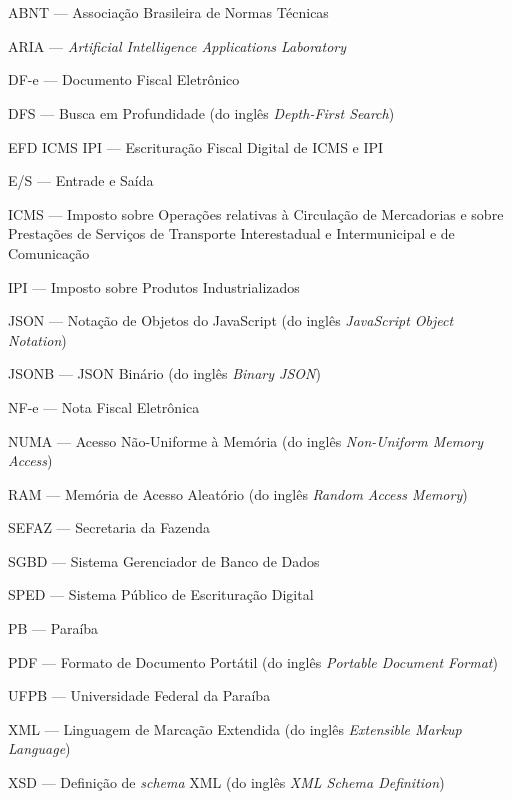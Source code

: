 \section*{}

ABNT --- Associação Brasileira de Normas Técnicas

ARIA --- \textit{Artificial Intelligence Applications Laboratory}

DF-e --- Documento Fiscal Eletrônico

DFS --- Busca em Profundidade (do inglês \textit{Depth-First Search})

EFD ICMS IPI --- Escrituração Fiscal Digital de ICMS e IPI

E/S --- Entrade e Saída

ICMS --- Imposto sobre Operações relativas à Circulação de Mercadorias e sobre Prestações
de Serviços de Transporte Interestadual e Intermunicipal e de Comunicação

IPI --- Imposto sobre Produtos Industrializados

JSON --- Notação de Objetos do JavaScript (do inglês \textit{JavaScript Object Notation})

JSONB --- JSON Binário (do inglês \textit{Binary JSON})

NF-e --- Nota Fiscal Eletrônica

NUMA --- Acesso Não-Uniforme à Memória (do inglês \textit{Non-Uniform Memory Access})

RAM --- Memória de Acesso Aleatório (do inglês \textit{Random Access Memory})

SEFAZ --- Secretaria da Fazenda

SGBD --- Sistema Gerenciador de Banco de Dados

SPED --- Sistema Público de Escrituração Digital

PB --- Paraíba

PDF --- Formato de Documento Portátil (do inglês \textit{Portable Document Format})

UFPB --- Universidade Federal da Paraíba

XML --- Linguagem de Marcação Extendida (do inglês \textit{Extensible Markup Language})

XSD --- Definição de \textit{schema} XML (do inglês \textit{XML Schema Definition})